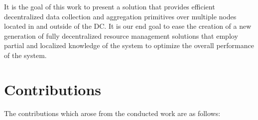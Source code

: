 It is the goal of this work to present a solution that provides efficient decentralized data collection and aggregation primitives over multiple nodes located in and outside of the DC. It is our end goal to ease the creation of a new generation of fully decentralized resource management solutions that employ partial and localized knowledge of the system to optimize the overall performance of the system.



\section{Contributions}

The contributions which arose from the conducted work are as follows:

